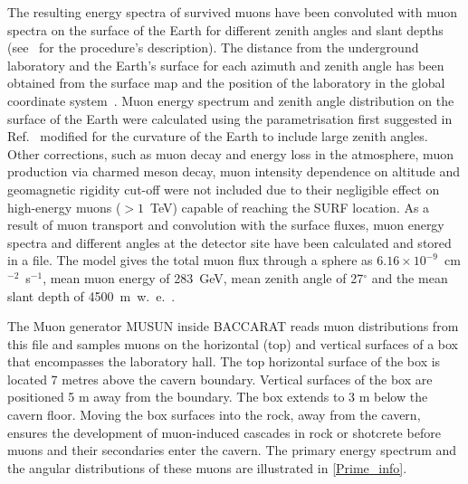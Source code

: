 The resulting energy spectra of survived muons have been convoluted with muon spectra on the surface of the Earth for different zenith angles and slant depths (see~\cite{musun} for the procedure's description). The distance from the underground laboratory and the Earth's surface for each azimuth and zenith angle has been obtained from the surface map and the position of the laboratory in the global coordinate system~\cite{richardson}.
Muon energy spectrum and zenith angle distribution on the surface of the Earth were calculated using the parametrisation first suggested in Ref.~\cite{Gaisser_Engel_Resconi_2016} modified for the curvature of the Earth to include large zenith angles. Other corrections, such as muon decay and energy loss in the atmosphere, muon production via charmed meson decay, muon intensity dependence on altitude and geomagnetic rigidity cut-off were not included due to their negligible effect on high-energy muons ($>1$~TeV) capable of reaching the SURF location.
As a result of muon transport and convolution with the surface fluxes, muon energy spectra and different angles at the detector site have been calculated and stored in a file. The model gives the total muon flux through a sphere as $6.16\times10^{-9}$~cm$^{-2}$~s$^{-1}$, mean muon energy of 283~GeV, mean zenith angle of 27$^{\circ}$ and the mean slant depth of 4500~m~w.~e.~\cite{musun-lz}.

The Muon generator MUSUN inside BACCARAT reads muon distributions from this file and samples muons on the horizontal (top) and vertical surfaces of a box that encompasses the laboratory hall. The top horizontal surface of the box is located 7 metres above the cavern boundary. Vertical surfaces of the box are positioned 5 m away from the boundary. The box extends to 3 m below the cavern floor. Moving the box surfaces into the rock, away from the cavern, ensures the development of muon-induced cascades in rock or shotcrete before muons and their secondaries enter the cavern. The primary energy spectrum and the angular distributions of these muons are illustrated in \autoref{Prime_info}.

